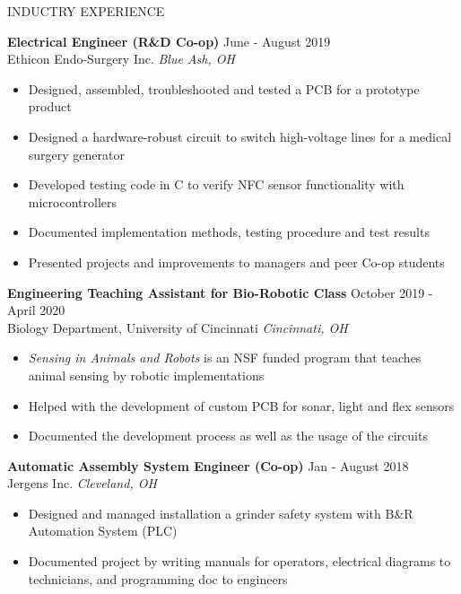 \documentclass{../lib/resume} %
\begin{document}
    \begin{rSection}{INDUCTRY EXPERIENCE}

        \textbf{Electrical Engineer (R\&D Co-op)} \hfill June - August 2019\\
        Ethicon Endo-Surgery Inc. \hfill \textit{Blue Ash, OH}
        \begin{itemize}
            \itemsep -4pt {}
            \item Designed, assembled, troubleshooted and tested a PCB for a prototype product
            \item Designed a hardware-robust circuit to switch high-voltage lines for a medical surgery generator
            \item Developed testing code in C to verify NFC sensor functionality with microcontrollers
            \item Documented implementation methods, testing procedure and test results
            \item Presented projects and improvements to managers and peer Co-op students
        \end{itemize}

        \textbf{Engineering Teaching Assistant for Bio-Robotic Class} \hfill October 2019 - April 2020\\
        Biology Department, University of Cincinnati \hfill \textit{Cincinnati, OH}
        \begin{itemize}
            \itemsep -4pt {}
            \item \textit{Sensing in Animals and Robots} is an NSF funded program that teaches animal sensing by robotic implementations
            \item Helped with the development of custom PCB for sonar, light and flex sensors
            \item Documented the development process as well as the usage of the circuits
        \end{itemize}

        \textbf{Automatic Assembly System Engineer (Co-op)} \hfill Jan - August 2018
        \\	Jergens Inc. \hfill \textit{Cleveland, OH}
        \begin{itemize}
            \itemsep -4pt {}
            \item Designed and managed installation a grinder safety system with B\&R Automation System (PLC)
            \item Documented project by writing manuals for operators, electrical diagrams to technicians, and programming doc to engineers
        \end{itemize}



    \end{rSection}
\end{document}
